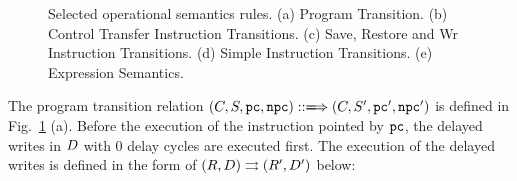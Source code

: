 \begin{figure}
	\caption{Selected operational semantics rules. 
	(a) Program Transition. 
	(b) Control Transfer Instruction Transitions. 
	(c) Save, Restore and Wr Instruction Transitions. 
	(d) Simple Instruction Transitions. 
	(e) Expression Semantics.}
	\label{Selected Operational Semantics}
\end{figure}
The program transition relation
$\LGlobTrans{(\code, \state, \pc, \npc)}
	{ \ \, }
	{(\code, \state', \pc', \npc')}$
is defined
in Fig.~\ref{Selected Operational Semantics} (a).
Before the execution of the instruction pointed by
$\texttt{pc}$, the delayed writes
in $D$ with $0$ delay cycles are executed first.
The execution of the delayed writes is defined in the
form of ${(R, D)}\rightrightarrows{(R', D')}$ below:

